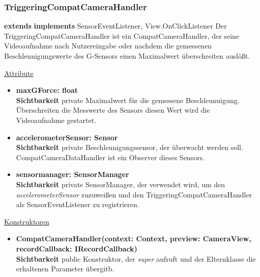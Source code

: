\subsubsection{TriggeringCompatCameraHandler} \label{app:klasse:TriggeringCompatCameraHandler}
\textbf{extends}  \newline
\textbf{implements} SensorEventListener, View.OnClickListener \newline
Der TriggeringCompatCameraHandler ist ein CompatCameraHandler, der seine Videoaufnahme nach Nutzereingabe oder nachdem die gemessenen Beschleunigungswerte des G-Sensors einen Maximalwert überschreiten auslößt.
\newline

\underline{Attribute}
\begin{itemize}
\itemsep0pt
\item \textbf{maxGForce: float} \hfill\\ 
\textbf{Sichtbarkeit} private \newline
Maximalwert für die gemessene Beschleunuigung. Überschreiten die Messwerte des Sensors diesen Wert wird die Videoaufnahme gestartet.

\item \textbf{accelerometerSensor: Sensor} \hfill\\ 
\textbf{Sichtbarkeit} private \newline
Beschleunigungssensor, der überwacht werden soll. CompatCameraDataHandler ist ein Observer dieses Sensors.

\item \textbf{sensormanager: SensorManager} \hfill\\ 
\textbf{Sichtbarkeit} private \newline
SensorManager, der verwendet wird, um den \textit{accelerometerSensor} zuzuweißen und den TriggeringCompatCameraHandler als SensorEventListener zu registrieren.
\end{itemize}

\underline{Konstruktoren}
\begin{itemize}
\itemsep0pt
\item \textbf{CompatCameraHandler(context: Context, preview: CameraView, recordCallback: IRecordCallback)} \hfill\\
\textbf{Sichtbarkeit} public\newline
Konstruktor, der \textit{super} aufruft und der Elternklasse die erhaltenen Parameter übergitb.
\end{itemize}

